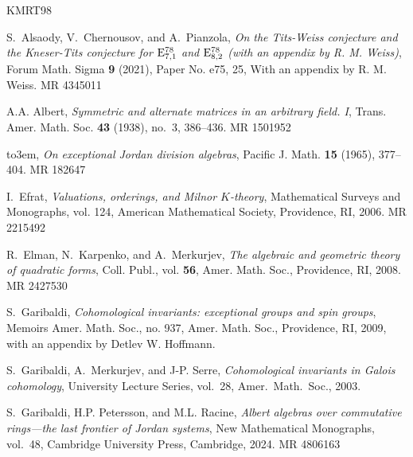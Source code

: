 \documentclass{amsart}
\theoremstyle{definition} %
\theoremstyle{remark} %
\renewcommand{\:}{\colon\,}
\numberwithin{equation}{section}
\begin{document}
		
	




\def\cprime{$'$}
\providecommand{\bysame}{\leavevmode\hbox to3em{\hrulefill}\thinspace}
\providecommand{\MR}{\relax\ifhmode\unskip\space\fi MR }
\providecommand{\MRhref}[2]{%
  \href{http://www.ams.org/mathscinet-getitem?mr=#1}{#2}
}
\begin{thebibliography}{KMRT98}

S.~Alsaody, V.~Chernousov, and A.~Pianzola, \emph{On the {T}its-{W}eiss conjecture and the {K}neser-{T}its conjecture for {$\rm E^{78}_{7,1}$} and {$\rm E^{78}_{8,2}$} (with an appendix by {R}. {M}. {W}eiss)}, Forum Math. Sigma \textbf{9} (2021), Paper No. e75, 25, With an appendix by R. M. Weiss. \MR{4345011}

A.A. Albert, \emph{Symmetric and alternate matrices in an arbitrary field. {I}}, Trans. Amer. Math. Soc. \textbf{43} (1938), no.~3, 386--436. \MR{1501952}

\bysame, \emph{On exceptional {J}ordan division algebras}, Pacific J. Math. \textbf{15} (1965), 377--404. \MR{182647}

I.~Efrat, \emph{Valuations, orderings, and {M}ilnor {$K$}-theory}, Mathematical Surveys and Monographs, vol. 124, American Mathematical Society, Providence, RI, 2006. \MR{2215492}

R.~Elman, N.~Karpenko, and A.~Merkurjev, \emph{The algebraic and geometric theory of quadratic forms}, Coll. Publ., vol. \textbf{56}, Amer. Math. Soc., Providence, RI, 2008. \MR{2427530}

S.~Garibaldi, \emph{Cohomological invariants: exceptional groups and spin groups}, Memoirs Amer. Math. Soc., no. 937, Amer. Math. Soc., Providence, RI, 2009, with an appendix by Detlev W. Hoffmann.

S.~Garibaldi, A.~Merkurjev, and J-P. Serre, \emph{Cohomological invariants in {G}alois cohomology}, University Lecture Series, vol.~28, Amer.\ Math.\ Soc., 2003.

S.~Garibaldi, H.P. Petersson, and M.L. Racine, \emph{Albert algebras over commutative rings---the last frontier of {J}ordan systems}, New Mathematical Monographs, vol.~48, Cambridge University Press, Cambridge, 2024. \MR{4806163}


\end{thebibliography}
\end{document}
